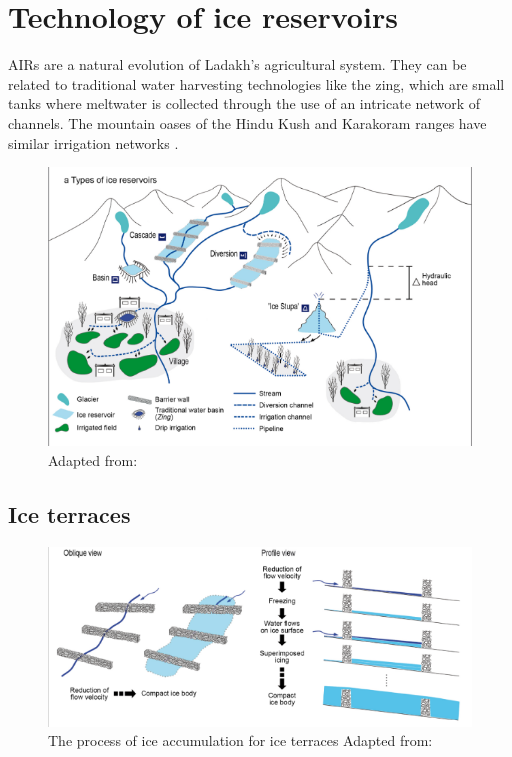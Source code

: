 \chapter{Technology of ice reservoirs}


AIRs are a natural evolution of Ladakh's agricultural system. They can be related to traditional water
harvesting technologies like the {zing}, which are small tanks where meltwater is collected through the use
of an intricate network of channels. The mountain oases of the Hindu Kush and Karakoram ranges
have similar irrigation networks \citep{nusserLocalKnowledgeGlobal2016}.

\begin{figure}[t]
\centering
\includegraphics[width=12cm]{figs/AIR_designs.png}

\caption{Adapted from: \cite{nusserSociohydrologyArtificialGlaciers2019}}

\label{fig:AIRdesigns}
\end{figure}

\section{Ice terraces}


\begin{figure}[t]
\centering
\includegraphics[width=12cm]{figs/IT_science.png}

\caption{ The process of ice accumulation for ice terraces Adapted from:
\cite{nusserSociohydrologyArtificialGlaciers2019}}

\label{fig:ITscience}
\end{figure}

